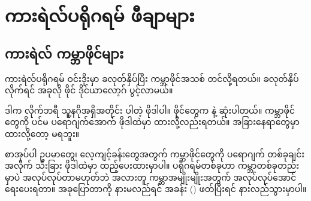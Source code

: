 \chapter{ကားရဲလ်ပရိုဂရမ် ဖီချာများ}\label{apdx:02}

\section*{ကားရဲလ် ကမ္ဘာဖိုင်များ}

ကားရဲလ်ပရိုဂရမ် ဝင်းဒိုးမှာ  ခလုတ်နှိပ်ပြီး ကမ္ဘာဖိုင်အသစ် တင်လို့ရတယ်။ ခလုတ်နှိပ်လိုက်ရင် အခုလို ဖိုင် ဒိုင်ယာလော့ဂ် ပွင့်လာမယ်။

\begin{figure}[tbh!]
\caption{} 
\label{fig:dftworlds}
\end{figure}

ဒါက  လိုက်ဘရီ သူ့နဂိုအရှိအတိုင်း ပါတဲ့  ဖိုဒါပါ။ ဖိုင်တွေက   နဲ့ ဆုံးပါတယ်။  ကမ္ဘာဖိုင်တွေကို ပင်မ ပရောဂျက်အောက်  ဖိုဒါထဲမှာ ထားလို့လည်းရတယ်။ အခြားနေရာတွေမှာ ထားလို့တော့ မရဘူး။

စာအုပ်ပါ ဥပမာတွေ၊ လေ့ကျင့်ခန်းတွေအတွက် ကမ္ဘာဖိုင်တွေကို ပရောဂျက် တစ်ခုချင်းအလိုက် သီးခြား  ဖိုဒါထဲမှာ ထည့်ပေးထားမှာပါ။ ပရိုဂရမ်တစ်ခုဟာ ကမ္ဘာတစ်ခုတည်းမှာပဲ အလုပ်လုပ်တာမဟုတ်ဘဲ အလားတူ ကမ္ဘာအမျိုးမျိုးအတွက် အလုပ်လုပ်အောင် ရေးပေးရတာ။ အခုပြောတာကို နားမလည်ရင် အခန်း (\fRefNo{\ref{ch:ch02}}) ဖတ်ပြီးရင် နားလည်သွားမှာပါ။

